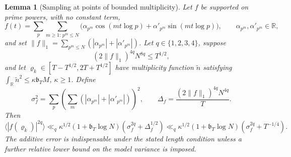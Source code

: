 \documentclass[11pt,reqno]{amsart}
\numberwithin{equation}{section}
\theoremstyle{plain}
\newtheorem{lemma}[theorem]{Lemma}
\theoremstyle{definition}
\theoremstyle{remark}
\newcommand{\bb}{\mathfrak b_T}
\begin{document}
\begin{lemma}[Sampling at points of bounded multiplicity]\label{lem:sampling}
Let $f$ be supported on prime powers, with no constant term,
\[
f(t)=\sum_p\sum_{m\ge1:\,p^m\le N}\bigl(\alpha_{p^m}\cos(mt\log p)+\alpha'_{p^m}\sin(mt\log p)\bigr),
\qquad \alpha_{p^m},\alpha'_{p^m}\in\mathbb R,
\]
and set $\|f\|_1=\sum_{p^m\le N}(|\alpha_{p^m}|+|\alpha'_{p^m}|)$. Let $q\in\{1,2,3,4\}$, suppose
\[
(2\|f\|_1)^{4q}N^{8q}\le T^{1/2},
\]
and let $\varrho_k\in[T-T^{1/2},2T+T^{1/2}]$ have multiplicity function $\tilde n$ satisfying $\int_{\mathbb R}\tilde n^2\le\kappa\bb M$, $\kappa\ge1$. Define
\[
\sigma_f^2=\sum_p\left(\sum_m(|\alpha_{p^m}|+|\alpha'_{p^m}|)\right)^2,
\qquad
\Delta_f=\frac{(2\|f\|_1)^{4q}N^{4q}}{T}.
\]
Then
\begin{equation}
\bigl\langle |f(\varrho_k)|^{2q}\bigr\rangle
\ll_q\kappa^{1/2}(1+\bb\log N)
\left(\sigma_f^{2q}+\Delta_f^{1/2}\right)
\ll_q\kappa^{1/2}(1+\bb\log N)
\left(\sigma_f^{2q}+T^{-1/4}\right).
\label{eq:sampling_corrected}
\end{equation}
The additive error is indispensable under the stated length condition unless a further \emph{relative} lower bound on the model variance is imposed.
\end{lemma}
\end{document}
